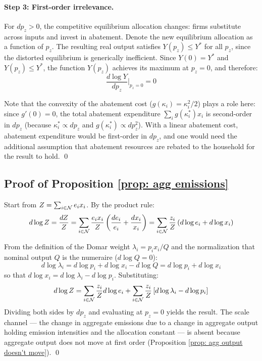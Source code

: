 \paragraph{Step 3: First-order irrelevance.} For $dp_z > 0$, the competitive equilibrium allocation changes: firms substitute across inputs and invest in abatement. Denote the new equilibrium allocation as a function of $p_z$. The resulting real output satisfies $Y(p_z) \leq Y^*$ for all $p_z$, since the distorted equilibrium is generically inefficient. Since $Y(0) = Y^*$ and $Y(p_z) \leq Y^*$, the function $Y(p_z)$ achieves its maximum at $p_z = 0$, and therefore:
\begin{equation*}
    \frac{d \log Y}{dp_z}\bigg|_{p_z = 0} = 0
\end{equation*}

Note that the convexity of the abatement cost ($g(\kappa_i) = \kappa_i^2/2$) plays a role here: since $g'(0) = 0$, the total abatement expenditure $\sum_i g(\kappa_i^*) x_i$ is second-order in $dp_z$ (because $\kappa_i^* \propto dp_z$ and $g(\kappa_i^*) \propto dp_z^2$). With a linear abatement cost, abatement expenditure would be first-order in $dp_z$, and one would need the additional assumption that abatement resources are rebated to the household for the result to hold. \qed

\subsection{Proof of Proposition \ref{prop: agg emissions}}

Start from $Z = \sum_{i \in \mathcal{N}} e_i x_i$. By the product rule:
\begin{equation*}
    d \log Z = \frac{dZ}{Z} = \sum_{i \in \mathcal{N}} \frac{e_i x_i}{Z}\left(\frac{de_i}{e_i} + \frac{dx_i}{x_i}\right) = \sum_{i \in \mathcal{N}} \frac{z_i}{Z}\left(d \log e_i + d \log x_i\right)
\end{equation*}

From the definition of the Domar weight $\lambda_i = p_i x_i / Q$ and the normalization that nominal output $Q$ is the numeraire ($d \log Q = 0$):
\begin{equation*}
    d \log \lambda_i = d \log p_i + d \log x_i - d \log Q = d \log p_i + d \log x_i
\end{equation*}
so that $d \log x_i = d \log \lambda_i - d \log p_i$. Substituting:
\begin{equation*}
    d \log Z = \sum_{i \in \mathcal{N}} \frac{z_i}{Z} d \log e_i + \sum_{i \in \mathcal{N}} \frac{z_i}{Z}\left[d \log \lambda_i - d \log p_i\right]
\end{equation*}
Dividing both sides by $dp_z$ and evaluating at $p_z = 0$ yields the result. The scale channel --- the change in aggregate emissions due to a change in aggregate output holding emission intensities and the allocation constant --- is absent because aggregate output does not move at first order (Proposition \ref{prop: agg output doesn't move}). \qed

